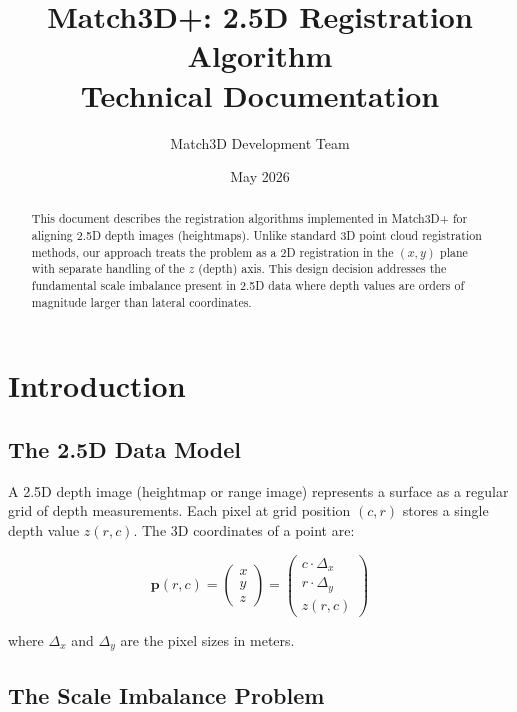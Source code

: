 \documentclass[11pt,a4paper]{article}
\title{Match3D+: 2.5D Registration Algorithm\\[0.5em]\large Technical Documentation}
\author{Match3D Development Team}
\date{May 2026}
\begin{document}
\maketitle

\begin{abstract}
This document describes the registration algorithms implemented in Match3D+ for aligning 2.5D depth images (heightmaps). Unlike standard 3D point cloud registration methods, our approach treats the problem as a 2D registration in the $(x,y)$ plane with separate handling of the $z$ (depth) axis. This design decision addresses the fundamental scale imbalance present in 2.5D data where depth values are orders of magnitude larger than lateral coordinates.
\end{abstract}

\tableofcontents
\newpage

\section{Introduction}

\subsection{The 2.5D Data Model}

A 2.5D depth image (heightmap or range image) represents a surface as a regular grid of depth measurements. Each pixel at grid position $(c, r)$ stores a single depth value $z(r, c)$. The 3D coordinates of a point are:

\begin{equation}
\mathbf{p}(r,c) = \begin{pmatrix} x \\ y \\ z \end{pmatrix} = \begin{pmatrix} c \cdot \Delta_x \\ r \cdot \Delta_y \\ z(r,c) \end{pmatrix}
\end{equation}

where $\Delta_x$ and $\Delta_y$ are the pixel sizes in meters.

\subsection{The Scale Imbalance Problem}
\end{document}
